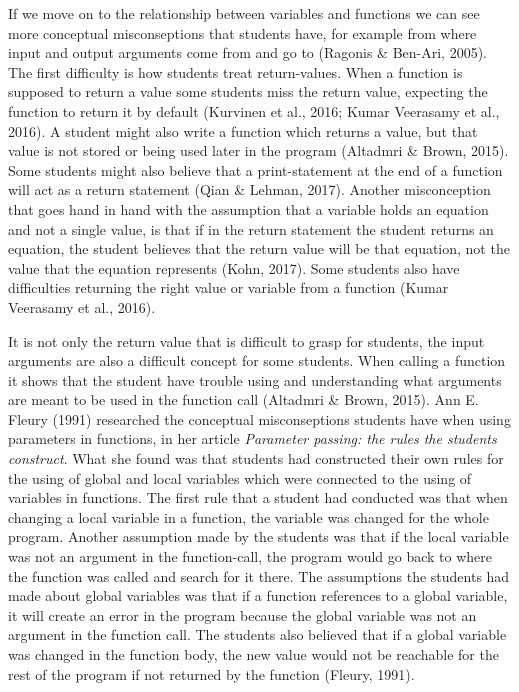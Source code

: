 If we move on to the relationship between variables and functions we can see more conceptual misconseptions that students have, for example from where input and output arguments come from and go to (Ragonis \& Ben-Ari, 2005). The first difficulty is how students treat return-values. When a function is supposed to return a value some students miss the return value, expecting the function to return it by default (Kurvinen et al., 2016; Kumar Veerasamy et al., 2016). A student might also write a function which returns a value, but that value is not stored or being used later in the program (Altadmri \& Brown, 2015). Some students might also believe that a print-statement at the end of a function will act as a return statement (Qian \& Lehman, 2017). Another misconception that goes hand in hand with the assumption that a variable holds an equation and not a single value, is that if in the return statement the student returns an equation, the student believes that the return value will be that equation, not the value that the equation represents (Kohn, 2017). Some students also have difficulties returning the right value or variable from a function (Kumar Veerasamy et al., 2016). 

It is not only the return value that is difficult to grasp for students, the input arguments are also a difficult concept for some students. When calling a function it shows that the student have trouble using and understanding what arguments are meant to be used in the function call (Altadmri \& Brown, 2015). Ann E. Fleury (1991) researched the conceptual misconseptions students have when using parameters in functions, in her article \emph{Parameter passing: the rules the students construct}. What she found was that students had constructed their own rules for the using of global and local variables which were connected to the using of variables in functions. The first rule that a student had conducted was that when changing a local variable in a function, the variable was changed for the whole program. Another assumption made by the students was that if the local variable was not an argument in the function-call, the program would go back to where the function was called and search for it there. The assumptions the students had made about global variables was that if a function references to a global variable, it will create an error in the program because the global variable was not an argument in the function call. The students also believed that if a global variable was changed in the function body, the new value would not be reachable for the rest of the program if not returned by the function (Fleury, 1991).

